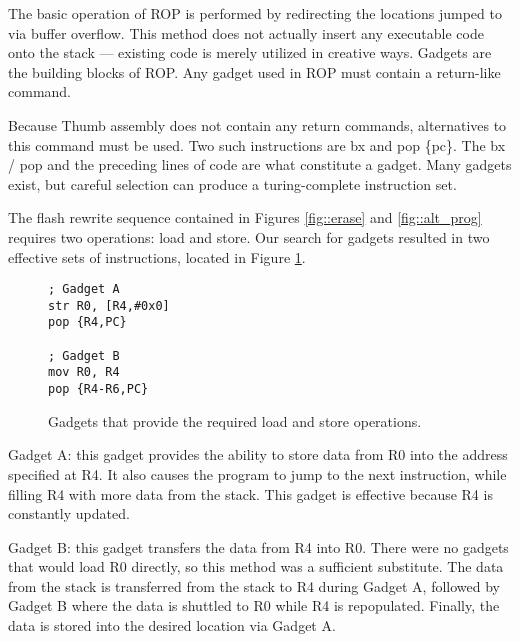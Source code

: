 The basic operation of ROP is performed by redirecting the locations jumped to via buffer overflow. This method does not actually insert any executable code onto the stack --- existing code is merely utilized in creative ways. Gadgets are the building blocks of ROP. Any gadget used in ROP must contain a return-like command. 

Because Thumb assembly does not contain any return commands, alternatives to this command must be used. Two such instructions are bx and pop \{pc\}. The bx / pop and the preceding lines of code are what constitute a gadget. Many gadgets exist, but careful selection can produce a turing-complete instruction set. 

The flash rewrite sequence contained in Figures \ref{fig::erase} and \ref{fig::alt_prog} requires two operations: load and store. Our search for gadgets resulted in two effective sets of instructions, located in Figure \ref{fig::gadget1}. 

	\begin{figure}[htbp]
		\begin{lstlisting}
; Gadget A
str R0, [R4,#0x0]
pop {R4,PC}

; Gadget B
mov R0, R4
pop {R4-R6,PC}
		\end{lstlisting}
		\caption{Gadgets that provide the required load and store operations. }\label{fig::gadget1}
	\end{figure}
Gadget A: this gadget provides the ability to store data from R0 into the address specified at R4. It also causes the program to jump to the next instruction, while filling R4 with more data from the stack. This gadget is effective because R4 is constantly updated. 

Gadget B: this gadget transfers the data from R4 into R0. There were no gadgets that would load R0 directly, so this method was a sufficient substitute. The data from the stack is transferred from the stack to R4 during Gadget A, followed by Gadget B where the data is shuttled to R0 while R4 is repopulated. Finally, the data is stored into the desired location via Gadget A. 


